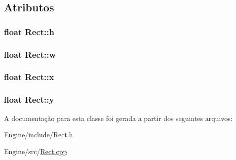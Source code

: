 \subsection{Atributos}
\hypertarget{classRect_aa10c9b8950c6b23a0b2bf0d39f2be904}{
\subsubsection[{h}]{\setlength{\rightskip}{0pt plus 5cm}float Rect\+::h}}\label{classRect_aa10c9b8950c6b23a0b2bf0d39f2be904}
\hypertarget{classRect_a049f7ee5e7eb0475229bf3ed9b3bad44}{
\subsubsection[{w}]{\setlength{\rightskip}{0pt plus 5cm}float Rect\+::w}}\label{classRect_a049f7ee5e7eb0475229bf3ed9b3bad44}
\hypertarget{classRect_a29bc9b88a8c5537620f05ac7069f48cc}{
\subsubsection[{x}]{\setlength{\rightskip}{0pt plus 5cm}float Rect\+::x}}\label{classRect_a29bc9b88a8c5537620f05ac7069f48cc}
\hypertarget{classRect_a4ea33d8210fa0b8b0d6ef3f7e06e6b27}{
\subsubsection[{y}]{\setlength{\rightskip}{0pt plus 5cm}float Rect\+::y}}\label{classRect_a4ea33d8210fa0b8b0d6ef3f7e06e6b27}


A documentação para esta classe foi gerada a partir dos seguintes arquivos\+:\begin{DoxyCompactItemize}
\item 
Engine/include/\hyperlink{Rect_8h}{Rect.\+h}\item 
Engine/src/\hyperlink{Rect_8cpp}{Rect.\+cpp}\end{DoxyCompactItemize}
